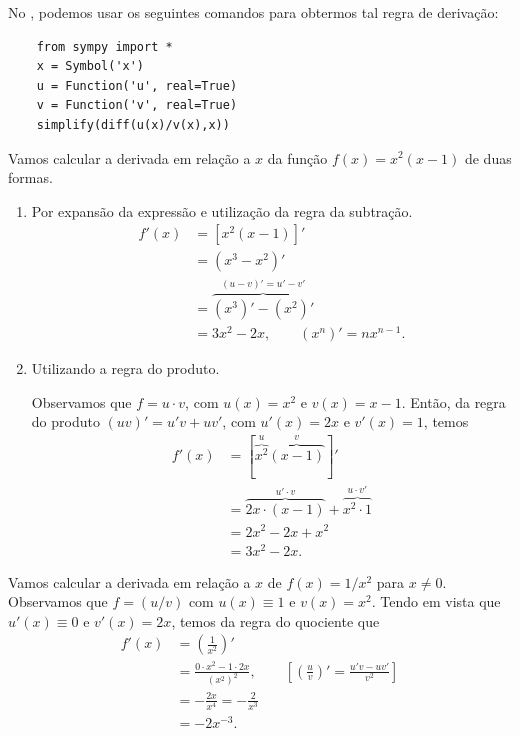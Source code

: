 \begin{itemize}
  \ifispython
  No \sympy, podemos usar os seguintes comandos para obtermos tal regra de derivação:
  \begin{lstlisting}
    from sympy import *
    x = Symbol('x')
    u = Function('u', real=True)
    v = Function('v', real=True)
    simplify(diff(u(x)/v(x),x))
\end{lstlisting}
  \fi
\end{itemize}

\begin{ex}
  Vamos calcular a derivada em relação a $x$ da função $f(x) = x^2(x-1)$ de duas formas.
  \begin{enumerate}[1.]
  \item Por expansão da expressão e utilização da regra da subtração.
    \begin{align}
      f'(x) &= [x^2(x-1)]'\\
            &= (x^3-x^2)' \\
            &= \overbrace{(x^3)'-(x^2)'}^{(u-v)'=u'-v'}\\
            &= 3x^2-2x,\quad\quad(x^n)' = nx^{n-1}.
    \end{align}
  \item Utilizando a regra do produto.

    Observamos que $f = u\cdot v$, com $u(x) = x^2$ e $v(x) = x-1$. Então, da regra do produto $(uv)' = u'v + uv'$, com $u'(x) = 2x$ e $v'(x) = 1$, temos
    \begin{align}
      f'(x) &= [\overbrace{x^2}^{u}\overbrace{(x-1)}^{v}]'\\
            &= \overbrace{2x\cdot (x-1)}^{u'\cdot v} + \overbrace{x^2\cdot 1}^{u\cdot v'}\\
            &= 2x^2 - 2x + x^2\\
            &= 3x^2 - 2x.
    \end{align}
  \end{enumerate}
\end{ex}

\begin{ex}\label{ex:deriv_x-2}
  Vamos calcular a derivada em relação a $x$ de $f(x) = 1/x^2$ para $x\neq 0$. Observamos que $f = (u/v)$ com $u(x) \equiv 1$ e $v(x) = x^2$. Tendo em vista que $u'(x) \equiv 0$ e $v'(x) = 2x$, temos da regra do quociente que
  \begin{align}
    f'(x) &= \left(\frac{1}{x^2}\right)' \\
          &= \frac{0\cdot x^2 - 1\cdot 2x}{(x^2)^2},\quad\quad\left[\left(\frac{u}{v}\right)' = \frac{u'v-uv'}{v^2}\right]\\
          &= -\frac{2x}{x^4} = -\frac{2}{x^3}\\
          &= -2x^{-3}.
  \end{align}
\end{ex}

